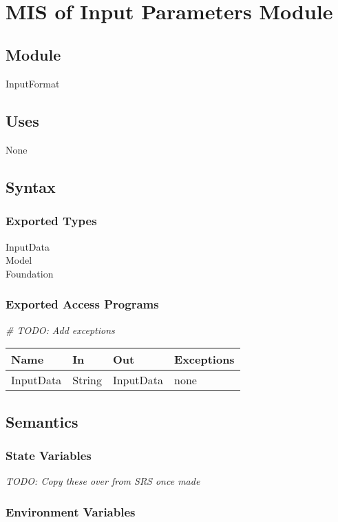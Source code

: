 \documentclass[12pt, titlepage]{article}
\begin{document}
\newpage
~\newpage

\section{MIS of Input Parameters Module} \label{InputParametersModule} 

\subsection{Module}
InputFormat
\subsection{Uses}
None
\subsection{Syntax}

\subsubsection{Exported Types}
InputData\\
Model \\
Foundation
\subsubsection{Exported Access Programs}

\emph{\# TODO: Add exceptions}
\begin{center}
\begin{tabular}{p{2cm} p{4cm} p{4cm} p{2cm}}
\hline
\textbf{Name} & \textbf{In} & \textbf{Out} & \textbf{Exceptions} \\
\hline
InputData & String & InputData & none \\
\hline
\end{tabular}
\end{center}

\subsection{Semantics}

\subsubsection{State Variables}

\emph{TODO: Copy these over from SRS once made}

\subsubsection{Environment Variables}
\end{document}
